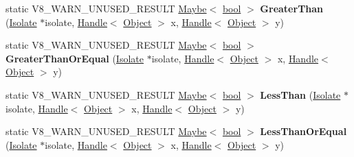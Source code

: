 \begin{DoxyCompactItemize}
\item 
\mbox{\label{classv8_1_1internal_1_1Object_aaa8922f7601b5d55fe85b6ddae3c71b6}} 
static V8\+\_\+\+W\+A\+R\+N\+\_\+\+U\+N\+U\+S\+E\+D\+\_\+\+R\+E\+S\+U\+LT \mbox{\hyperlink{classv8_1_1Maybe}{Maybe}}$<$ \mbox{\hyperlink{classbool}{bool}} $>$ {\bfseries Greater\+Than} (\mbox{\hyperlink{classv8_1_1internal_1_1Isolate}{Isolate}} $\ast$isolate, \mbox{\hyperlink{classv8_1_1internal_1_1Handle}{Handle}}$<$ \mbox{\hyperlink{classv8_1_1internal_1_1Object}{Object}} $>$ x, \mbox{\hyperlink{classv8_1_1internal_1_1Handle}{Handle}}$<$ \mbox{\hyperlink{classv8_1_1internal_1_1Object}{Object}} $>$ y)
\item 
\mbox{\label{classv8_1_1internal_1_1Object_a9dc8394e08e08370d71025a87d7bca17}} 
static V8\+\_\+\+W\+A\+R\+N\+\_\+\+U\+N\+U\+S\+E\+D\+\_\+\+R\+E\+S\+U\+LT \mbox{\hyperlink{classv8_1_1Maybe}{Maybe}}$<$ \mbox{\hyperlink{classbool}{bool}} $>$ {\bfseries Greater\+Than\+Or\+Equal} (\mbox{\hyperlink{classv8_1_1internal_1_1Isolate}{Isolate}} $\ast$isolate, \mbox{\hyperlink{classv8_1_1internal_1_1Handle}{Handle}}$<$ \mbox{\hyperlink{classv8_1_1internal_1_1Object}{Object}} $>$ x, \mbox{\hyperlink{classv8_1_1internal_1_1Handle}{Handle}}$<$ \mbox{\hyperlink{classv8_1_1internal_1_1Object}{Object}} $>$ y)
\item 
\mbox{\label{classv8_1_1internal_1_1Object_a1875d2f108864e0e5e9dfaf36eced4a4}} 
static V8\+\_\+\+W\+A\+R\+N\+\_\+\+U\+N\+U\+S\+E\+D\+\_\+\+R\+E\+S\+U\+LT \mbox{\hyperlink{classv8_1_1Maybe}{Maybe}}$<$ \mbox{\hyperlink{classbool}{bool}} $>$ {\bfseries Less\+Than} (\mbox{\hyperlink{classv8_1_1internal_1_1Isolate}{Isolate}} $\ast$isolate, \mbox{\hyperlink{classv8_1_1internal_1_1Handle}{Handle}}$<$ \mbox{\hyperlink{classv8_1_1internal_1_1Object}{Object}} $>$ x, \mbox{\hyperlink{classv8_1_1internal_1_1Handle}{Handle}}$<$ \mbox{\hyperlink{classv8_1_1internal_1_1Object}{Object}} $>$ y)
\item 
\mbox{\label{classv8_1_1internal_1_1Object_a4c994251cdc69ffaaf99270af07b39b3}} 
static V8\+\_\+\+W\+A\+R\+N\+\_\+\+U\+N\+U\+S\+E\+D\+\_\+\+R\+E\+S\+U\+LT \mbox{\hyperlink{classv8_1_1Maybe}{Maybe}}$<$ \mbox{\hyperlink{classbool}{bool}} $>$ {\bfseries Less\+Than\+Or\+Equal} (\mbox{\hyperlink{classv8_1_1internal_1_1Isolate}{Isolate}} $\ast$isolate, \mbox{\hyperlink{classv8_1_1internal_1_1Handle}{Handle}}$<$ \mbox{\hyperlink{classv8_1_1internal_1_1Object}{Object}} $>$ x, \mbox{\hyperlink{classv8_1_1internal_1_1Handle}{Handle}}$<$ \mbox{\hyperlink{classv8_1_1internal_1_1Object}{Object}} $>$ y)

\end{DoxyCompactItemize}
